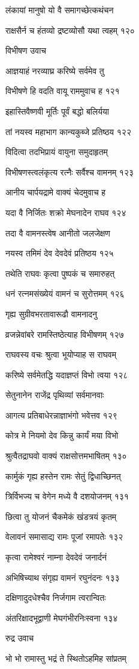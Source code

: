 लंकायां मानुषो यो वै समागच्छेत्कथंचन

राक्षसैर्न च हंतव्यो द्रष्टव्योसौ यथा त्वहम् १२०

विभीषण उवाच

आज्ञयाहं नरव्याघ्र करिष्ये सर्वमेव तु

विभीषणे हि वदति वायू राममुवाच ह १२१

इहास्तिवैष्णवी मूर्तिः पूर्वं बद्धो बलिर्यया

तां नयस्व महाभाग कान्यकुब्जे प्रतिष्ठय १२२

विदित्वा तदभिप्रायं वायुना समुदाहृतम्

विभीषणस्त्वलंकृत्य रत्नैः सर्वैश्च वामनम् १२३

आनीय चार्पयद्रामे वाक्यं चेदमुवाच ह

यदा वै निर्जितः शक्रो मेघनादेन राघव १२४

तदा वै वामनस्त्वेष आनीतो जलजेक्षण

नयस्व तमिमं देव देवदेवं प्रतिष्ठय १२५

तथेति राघवः कृत्वा पुष्पकं च समारुहत्

धनं रत्नमसंख्येयं वामनं च सुरोत्तमम् १२६

गृह्य सुग्रीवभरतावारूढौ वामनादनु

व्रजन्नेवांबरे रामस्तिष्ठेत्याह विभीषणम् १२७

राघवस्य वचः श्रुत्वा भूयोप्याह स राघवम्

करिष्ये सर्वमेतद्धि यदाज्ञप्तं विभो त्वया १२८

सेतुनानेन राजेंद्र पृथिव्यां सर्वमानवाः

आगत्य प्रतिबाधेरन्नाज्ञाभंगो भवेत्तव १२९

कोत्र मे नियमो देव किन्नु कार्यं मया विभो

श्रुत्वैतद्राघवो वाक्यं राक्षसोत्तमभाषितम् १३०

कार्मुकं गृह्य हस्तेन रामः सेतुं द्विधाच्छिनत्

त्रिर्विभज्य च वेगेन मध्ये वै दशयोजनम् १३१

छित्वा तु योजनं चैकमेकं खंडत्रयं कृतम्

वेलावनं समासाद्य रामः पूजां रमापतेः १३२

कृत्वा रामेश्वरं नाम्ना देवदेवं जनार्दनं

अभिषिच्याथ संगृह्य वामनं रघुनंदनः १३३

दक्षिणादुदधेश्चैव निर्जगाम त्वरान्वितः

अंतरिक्षादभूद्वाणी मेघगंभीरनिःस्वना १३४

रुद्र उवाच

भो भो रामास्तु भद्रं ते स्थितोऽहमिह सांप्रतम्

